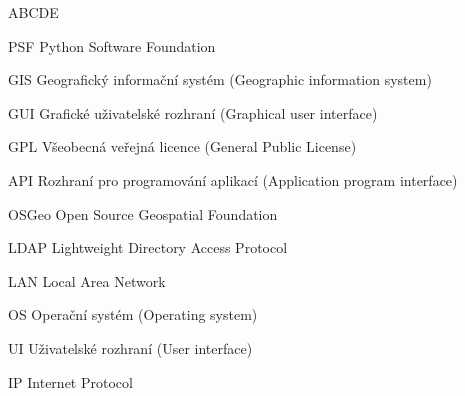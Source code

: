 
\begin{seznamzkratek}{ABCDE}      
	      
		  {PSF}
	      {Python Software Foundation}

	      {GIS}
	      {Geografický informační systém (Geographic information system)}
	         
	      {GUI}
	      {Grafické uživatelské rozhraní (Graphical user interface)}

	      {GPL}
	      {Všeobecná veřejná licence (General Public License)}
	      
	      {API}
	      {Rozhraní pro programování aplikací (Application program interface)}	      
	    
	      {OSGeo}
	      {Open Source Geospatial Foundation}
	      
	      {LDAP}
	      {Lightweight Directory Access Protocol} 
	      
	      {LAN}
	      {Local Area Network} 
	      	       
	      {OS}
	      {Operační systém (Operating system)} 

	      {UI}
	      {Uživatelské rozhraní (User interface)} 
	      
	      {IP}
	      {Internet Protocol} 	      	     

\end{seznamzkratek}